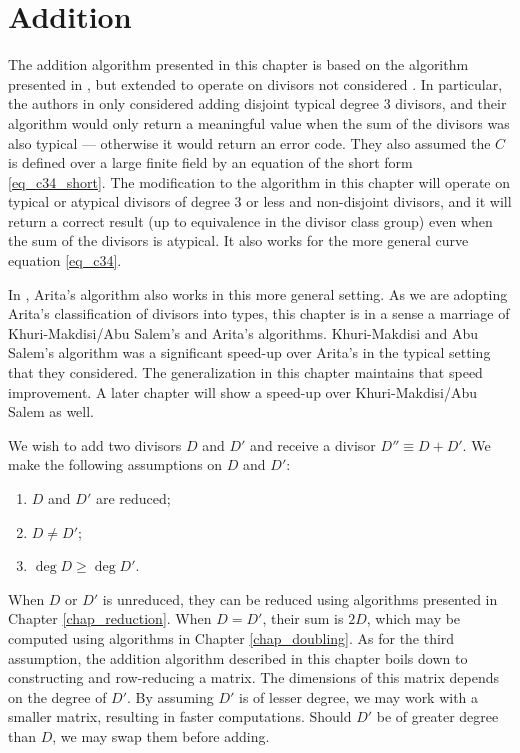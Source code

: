 
\section{Addition}
\label{chap_addition}

The addition algorithm presented in this chapter is based on the algorithm presented in \cite{salem07},
but extended to operate on divisors not considered \cite{salem07}.
In particular, the authors in \cite{salem07} only considered adding disjoint typical degree 3 divisors,
and their algorithm would only return a meaningful value when the sum of the divisors was also typical ---
otherwise it would return an error code.
They also assumed the $C$ is defined over a large finite field by an equation of the short form \ref{eq_c34_short}.
The modification to the algorithm in this chapter will operate on typical or atypical divisors of degree 3 or less
and non-disjoint divisors,
and it will return a correct result (up to equivalence in the divisor class group)
even when the sum of the divisors is atypical.
It also works for the more general curve equation \ref{eq_c34}.

In \cite{arita05-2}, Arita's algorithm also works in this more general setting.
As we are adopting Arita's classification of divisors into types,
this chapter is in a sense a marriage of Khuri-Makdisi/Abu Salem's and Arita's algorithms.
Khuri-Makdisi and Abu Salem's algorithm was a significant speed-up over Arita's in the typical setting that they considered.
The generalization in this chapter maintains that speed improvement.
A later chapter  will show a speed-up over Khuri-Makdisi/Abu Salem as well.

We wish to add two divisors $D$ and $D'$ and receive a divisor $D'' \equiv D + D'$.
We make the following assumptions on $D$ and $D'$:
\begin{enumerate}[label=(\roman*)]
  \item $D$ and $D'$ are reduced;
  \item $D \neq D'$;
  \item $\deg D \geq \deg D'$.
\end{enumerate}
When $D$ or $D'$ is unreduced, they can be reduced using algorithms presented in Chapter \ref{chap_reduction}.
When $D = D'$, their sum is $2D$, which may be computed using algorithms in Chapter \ref{chap_doubling}.
As for the third assumption,
the addition algorithm described in this chapter boils down to constructing and row-reducing a matrix.
The dimensions of this matrix depends on the degree of $D'$.
By assuming $D'$ is of lesser degree, we may work with a smaller matrix, resulting in faster computations.
Should $D'$ be of greater degree than $D$, we may swap them before adding.

